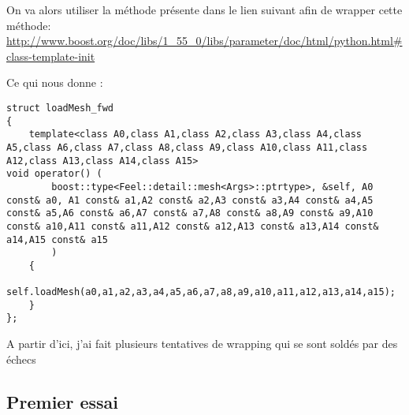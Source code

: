 \documentclass[12pt]{article}
\begin{document}
On va alors utiliser la méthode présente dans le lien suivant afin de wrapper cette méthode:
\url{http://www.boost.org/doc/libs/1_55_0/libs/parameter/doc/html/python.html#class-template-init}

Ce qui nous donne :
\begin{lstlisting}
struct loadMesh_fwd
{
    template<class A0,class A1,class A2,class A3,class A4,class A5,class A6,class A7,class A8,class A9,class A10,class A11,class A12,class A13,class A14,class A15>
void operator() ( 
        boost::type<Feel::detail::mesh<Args>::ptrtype>, &self, A0 const& a0, A1 const& a1,A2 const& a2,A3 const& a3,A4 const& a4,A5 const& a5,A6 const& a6,A7 const& a7,A8 const& a8,A9 const& a9,A10 const& a10,A11 const& a11,A12 const& a12,A13 const& a13,A14 const& a14,A15 const& a15
        )
    {
        self.loadMesh(a0,a1,a2,a3,a4,a5,a6,a7,a8,a9,a10,a11,a12,a13,a14,a15);
    }
};
\end{lstlisting}



A partir d'ici, j'ai fait plusieurs tentatives de wrapping qui se sont soldés par des échecs

\subsection{Premier essai}
\end{document}
